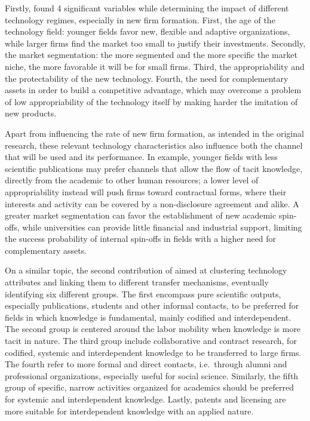 Firstly, \citet{Shane2001} found 4 significant variables while determining the impact of different technology regimes, especially in new firm formation. First, the age of the technology field: younger fields favor new, flexible and adaptive organizations, while larger firms find the market too small to justify their investments. Secondly, the market segmentation: the more segmented and the more specific the market niche, the more favorable it will be for small firms. Third, the appropriability and the protectability of the new technology. Fourth, the need for complementary assets in order to build a competitive advantage, which may overcome a problem of low appropriability of the technology itself by making harder the imitation of new products. 

Apart from influencing the rate of new firm formation, as intended in the original research, these relevant technology characteristics also influence both the channel that will be used and its performance. In example, younger fields with less scientific publications may prefer channels that allow the flow of tacit knowledge, directly from the academic to other human resources; a lower level of appropriability instead will push firms toward contractual forms, where their interests and activity can be covered by a non-disclosure agreement and alike. A greater market segmentation can favor the establishment of new academic spin-offs, while universities can provide little financial and industrial support, limiting the success probability of internal spin-offs in fields with a higher need for complementary assets.

On a similar topic, the second contribution of \citet{Bekkers2008} aimed at clustering technology attributes and linking them to different transfer mechanisms, eventually identifying six different groups. The first encompass pure scientific outputs, especially publications, students and other informal contacts, to be preferred for fields in which knowledge is fundamental, mainly codified and interdependent. The second group is centered around the labor mobility when knowledge is more tacit in nature. The third group include collaborative and contract research, for codified, systemic and interdependent knowledge to be transferred to large firms. The fourth refer to more formal and direct contacts, i.e.\ through alumni and professional organizations, especially useful for social science. Similarly, the fifth group of specific, narrow activities organized for academics should be preferred for systemic and interdependent knowledge. Lastly, patents and licensing are more suitable for interdependent knowledge with an applied nature. 

